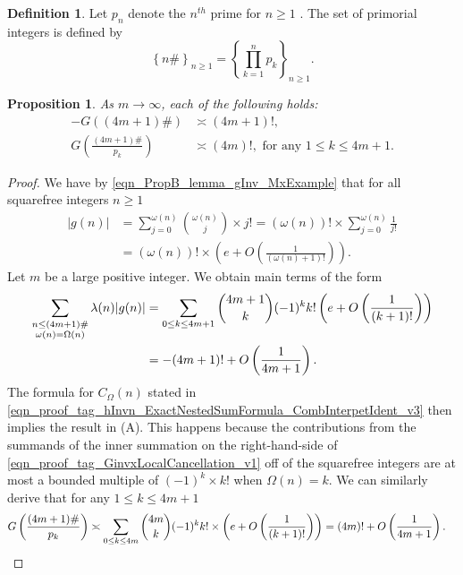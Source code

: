 \documentclass[11pt,reqno,a4letter]{article}
\numberwithin{equation}{section}
\numberwithin{figure}{section}
\numberwithin{table}{section}
\newcommand{\seqnum}[1]{\href{http://oeis.org/#1}{\color{ProcessBlue}{\underline{#1}}}}
\theoremstyle{plain}
\newtheorem{prop}[theorem]{Proposition}
\numberwithin{theorem}{section}
\theoremstyle{definition}
\newtheorem{definition}[theorem]{Definition}
\begin{document}
\begin{definition}
Let $p_n$ denote the $n^{th}$ prime for $n \geq 1$ 
\cite[\seqnum{A000040}]{OEIS}. 
The set of primorial integers is defined by  
\cite[\seqnum{A002110}]{OEIS} 
\[
\left\{n\#\right\}_{n \geq 1} = \left\{\prod_{k=1}^{n} p_k\right\}_{n \geq 1}. 
\]
\end{definition}

\begin{prop}
\label{theorem_PrimorialSeqGInvCalcs_v1} 
As $m \rightarrow \infty$, each of the following holds: 
\begin{align} 
\tag{A} 
-G((4m+1)\#) & \asymp (4m+1)!, \\ 
\tag{B} 
G\left(\frac{(4m+1)\#}{p_k}\right) & \asymp (4m)!, 
     \text{ for any } 1 \leq k \leq 4m+1. 
\end{align} 
\end{prop}
\begin{proof} 
We have by \eqref{eqn_PropB_lemma_gInv_MxExample} 
that for all squarefree integers $n \geq 1$ 
\begin{align*} 
|g(n)| & = \sum_{j=0}^{\omega(n)} \binom{\omega(n)}{j} \times j! 
     = (\omega(n))! \times \sum_{j=0}^{\omega(n)} \frac{1}{j!} \\ 
     & = (\omega(n))! \times \left(e + O\left(\frac{1}{(\omega(n)+1)!}\right)\right). 
\end{align*} 
Let $m$ be a large positive integer. 
We obtain main terms of the form 
\begin{align} 
\label{eqn_proof_tag_GinvxLocalCancellation_v1} 
\sum_{\substack{n \leq (4m+1)\# \\ \omega(n)=\Omega(n)}} \lambda(n) |g(n)| 
     & = \sum_{0 \leq k \leq 4m+1} \binom{4m+1}{k} (-1)^{k} k! 
     \left(e + O\left(\frac{1}{(k+1)!}\right)\right) \\ 
\notag 
     & = -(4m+1)! + O\left(\frac{1}{4m+1}\right). 
\end{align} 
The formula for $C_{\Omega}(n)$ stated in 
\eqref{eqn_proof_tag_hInvn_ExactNestedSumFormula_CombInterpetIdent_v3} 
then implies the result in (A). 
This happens because the contributions from the summands of the inner 
summation on the right-hand-side of 
\eqref{eqn_proof_tag_GinvxLocalCancellation_v1} 
off of the squarefree integers 
are at most a bounded multiple of $(-1)^k \times k!$ when $\Omega(n) = k$. 
We can similarly derive that for any $1 \leq k \leq 4m+1$ 
\begin{align*}
G\left(\frac{(4m+1)\#}{p_k}\right) & \asymp \sum_{0 \leq k \leq 4m} \binom{4m}{k} (-1)^{k} k! 
     \times \left(e + O\left(\frac{1}{(k+1)!}\right)\right) = (4m)! + O\left(\frac{1}{4m+1}\right). 
     \qedhere 
\end{align*}
\end{proof}
\end{document}
